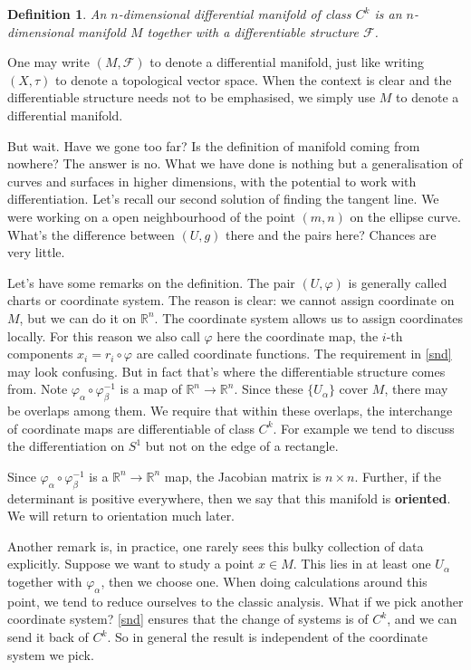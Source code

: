 \documentclass[twoside]{article}
\newtheorem{definition}{Definition}
\begin{document}
			\begin{definition}
				An $n$-dimensional differential manifold of class $C^k$ is an $n$-dimensional manifold $M$ together with a differentiable structure $\mathscr{F}$.
			\end{definition}
			One may write $(M,\mathscr{F})$ to denote a differential manifold, just like writing $(X,\tau)$ to denote a topological vector space. When the context is clear and the differentiable structure needs not to be emphasised, we simply use $M$ to denote a differential manifold.
			
			But wait. Have we gone too far? Is the definition of manifold coming from nowhere? The answer is no. What we have done is nothing but a generalisation of curves and surfaces in higher dimensions, with the potential to work with differentiation. Let's recall our second solution of finding the tangent line. We were working on a open neighbourhood of the point $(m,n)$ on the ellipse curve. What's the difference between $(U,g)$ there and the pairs here? Chances are very little.
			
			Let's have some remarks on the definition. The pair $(U,\varphi)$ is generally called charts or coordinate system. The reason is clear: we cannot assign coordinate on $M$, but we can do it on $\mathbb{R}^n$. The coordinate system allows us to assign coordinates locally. For this reason we also call $\varphi$ here the coordinate map, the $i$-th components $x_i = r_i \circ \varphi$ are called coordinate functions. The requirement in \ref{snd} may look confusing. But in fact that's where the differentiable structure comes from. Note $\varphi_\alpha \circ \varphi_\beta^{-1}$ is a map of $\mathbb{R}^n \to \mathbb{R}^n$. Since these $\{U_\alpha\}$ cover $M$, there may be overlaps among them. We require that within these overlaps, the interchange of coordinate maps are differentiable of class $C^k$. For example we tend to discuss the differentiation on $S^1$ but not on the edge of a rectangle.

			Since $\varphi_\alpha \circ \varphi_\beta^{-1}$ is a $\mathbb{R}^n \to \mathbb{R}^n$ map, the Jacobian matrix is $n \times n$. Further, if the determinant is positive everywhere, then we say that this manifold is \textbf{oriented}. We will return to orientation much later.
			
			Another remark is, in practice, one rarely sees this bulky collection of data explicitly. Suppose we want to study a point $x \in M$. This lies in at least one $U_\alpha$ together with $\varphi_\alpha$, then we choose one. When doing calculations around this point, we tend to reduce ourselves to the classic analysis. What if we pick another coordinate system? \ref{snd} ensures that the change of systems is of $C^k$, and we can send it back of $C^k$. So in general the result is independent of the coordinate system we pick. 
\end{document}
